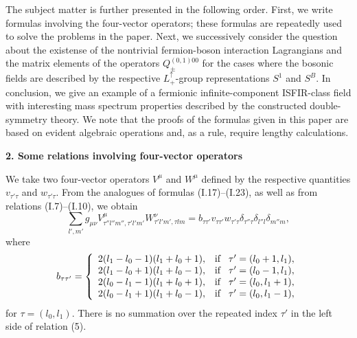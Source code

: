 \documentclass[a4paper,12pt]{article}
\begin{document}
The subject matter is further presented in the following order. First, we write
formulas involving the four-vector operators; these formulas are repeatedly 
used to solve the problems in the paper. Next, we successively consider the 
question about the existense of the nontrivial fermion-boson interaction 
Lagrangians and the matrix elements of the operators $Q^{(0,1)00}_{\pm}$ for 
the cases where the bosonic fields are described by the respective 
$L^{\uparrow}_{+}$-group representations $S^{1}$ and $S^{B}$. In conclusion, 
we give an example of a fermionic infinite-component ISFIR-class field with
interesting mass spectrum properties described by the constructed
double-symmetry theory. We note that the proofs of the formulas given in this
paper are based on evident algebraic operations and, as a rule, require lengthy
calculations.

\begin{center}
{\large \bf 2. Some relations involving four-vector operators}
\end{center}

We take two four-vector operators $V^{\mu}$ and $W^{\mu}$ defined by the
respective quantities $v_{\tau' \tau}$ and $w_{\tau' \tau}$. From the analogues
of formulas (I.17)--(I.23), as well as from relations (I.7)--(I.10), we obtain
\begin{equation}
\sum_{l',m'} g_{\mu\nu} V^{\mu}_{\tau'' l''m'', \tau' l'm'}
W^{\nu}_{\tau' l'm', \tau lm} = b_{\tau \tau'} v_{\tau \tau'} w_{\tau' \tau}
\delta_{\tau'' \tau} \delta_{l''l} \delta_{m''m},
\end{equation}
where 
\begin{equation}
b_{\tau \tau'} = \left\{
\begin{array}{ll}
2(l_{1}-l_{0}-1)(l_{1}+l_{0}+1), & {\mbox{\rm if}} \hspace{0.3cm} 
\tau'=(l_{0}+1,l_{1}), \\
2(l_{1}-l_{0}+1)(l_{1}+l_{0}-1), & {\mbox{\rm if}} \hspace{0.3cm}
\tau'=(l_{0}-1,l_{1}), \\
2(l_{0}-l_{1}-1)(l_{1}+l_{0}+1), & {\mbox{\rm if}} \hspace{0.3cm}
\tau'=(l_{0},l_{1}+1), \\
2(l_{0}-l_{1}+1)(l_{1}+l_{0}-1), & {\mbox{\rm if}} \hspace{0.3cm}
\tau'=(l_{0},l_{1}-1),
\end{array} \right.
\end{equation}
for $\tau = (l_{0},l_{1})$. There is no summation over the repeated index 
$\tau'$  in the left side of relation (5).
\end{document}
